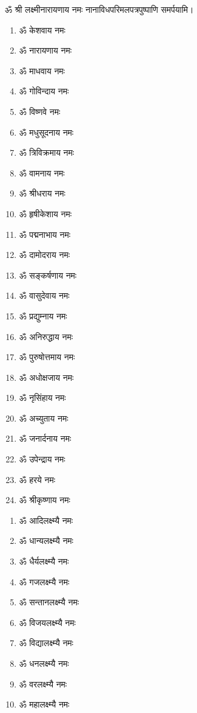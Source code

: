 \begin{center}
ॐ श्री लक्ष्मीनारायणाय नमः नानाविधपरिमलपत्रपुष्पाणि समर्पयामि। \medskip

\clearpage
{}

\begin{multicols}{2}
\begin{enumerate}
\item ॐ केशवाय नमः
\item ॐ नारायणाय नमः
\item ॐ माधवाय नमः
\item ॐ गोविन्दाय नमः
\item ॐ विष्णवे नमः 
\item ॐ मधुसूदनाय नमः
\item ॐ त्रिविक्रमाय नमः
\item ॐ वामनाय नमः
\item ॐ श्रीधराय नमः
\item ॐ हृषीकेशाय नमः
\item ॐ पद्मनाभाय नमः
\item ॐ दामोदराय नमः
\item ॐ सङ्कर्षणाय नमः
\item ॐ वासुदेवाय नमः
\item ॐ प्रद्युम्नाय नमः
\item ॐ अनिरुद्धाय नमः
\item ॐ पुरुषोत्तमाय नमः
\item ॐ अधोक्षजाय नमः
\item ॐ नृसिंहाय नमः
\item ॐ अच्युताय नमः
\item ॐ जनार्दनाय नमः
\item ॐ उपेन्द्राय नमः 
\item ॐ हरये नमः
\item ॐ श्रीकृष्णाय नमः
\end{enumerate}
\end{multicols}


\begin{multicols}{2}
\begin{enumerate}
\item ॐ आदिलक्ष्म्यै नमः
\item ॐ धान्यलक्ष्म्यै नमः
\item ॐ धैर्यलक्ष्म्यै नमः
\item ॐ गजलक्ष्म्यै नमः
\item ॐ सन्तानलक्ष्म्यै नमः
\item ॐ विजयलक्ष्म्यै नमः
\item ॐ विद्यालक्ष्म्यै नमः
\item ॐ धनलक्ष्म्यै नमः
\item ॐ वरलक्ष्म्यै नमः
\item ॐ महालक्ष्म्यै नमः 
\end{enumerate}
\end{multicols}


\end{center}
